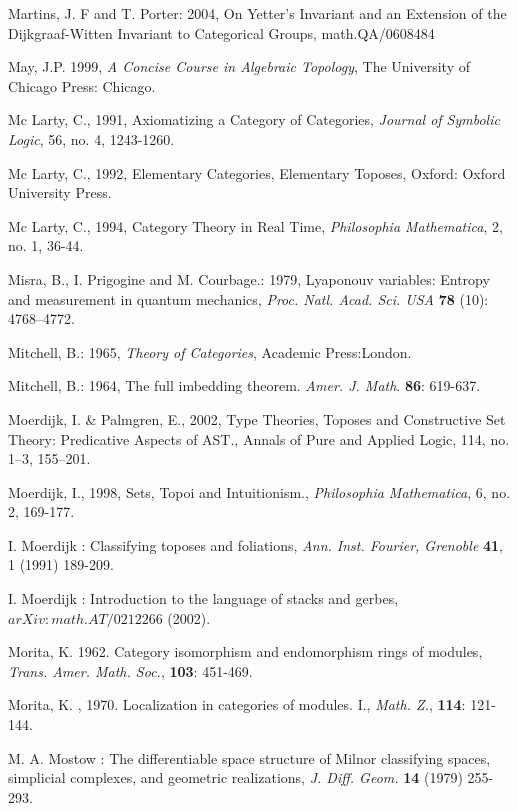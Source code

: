 \documentclass[12pt]{article}
\theoremstyle{plain}
\theoremstyle{definition}
\numberwithin{equation}{section}
\begin{document}
\begin{thebibliography}{99}
Martins, J. F and T. Porter: 2004, On Yetter's Invariant and an Extension of the Dijkgraaf-Witten Invariant to Categorical Groups, math.QA/0608484

May, J.P. 1999, \emph{A Concise Course in Algebraic Topology}, The University of Chicago Press: Chicago.

Mc Larty, C., 1991, Axiomatizing a Category of Categories, \emph{Journal of Symbolic Logic}, 56, no. 4, 1243-1260. 

Mc Larty, C., 1992, Elementary Categories, Elementary Toposes, Oxford: Oxford University Press.

Mc Larty, C., 1994, Category Theory in Real Time, \emph{Philosophia Mathematica}, 2, no. 1, 36-44.

Misra, B.,  I. Prigogine and M. Courbage.: 1979, Lyaponouv variables: Entropy and measurement in quantum mechanics,
\emph{Proc. Natl. Acad. Sci. USA} \textbf{78} (10): 4768--4772.

Mitchell, B.: 1965, \emph{Theory of Categories}, Academic Press:London.

Mitchell, B.: 1964, The full imbedding theorem. \emph{Amer. J. Math}. \textbf{86}: 619-637.

Moerdijk, I. \& Palmgren, E., 2002, Type Theories, Toposes and Constructive Set Theory: Predicative Aspects of AST., Annals of Pure and Applied Logic, 114, no. 1--3, 155--201. 

Moerdijk, I., 1998, Sets, Topoi and Intuitionism., \emph{Philosophia Mathematica}, 6, no. 2, 169-177.

I. Moerdijk : Classifying toposes and foliations, {\it Ann. Inst. Fourier, Grenoble} \textbf{41}, 1 (1991) 189-209.

I. Moerdijk : Introduction to the language of stacks and gerbes, $arXiv:math.AT/0212266$ (2002).

Morita, K. 1962. Category isomorphism and endomorphism rings of modules,
{\em Trans. Amer. Math. Soc.}, \textbf{103}: 451-469.

Morita, K. , 1970. Localization in categories of modules. I., {\em Math. Z.}, 
\textbf{114}: 121-144.

M. A. Mostow : The differentiable space structure of Milnor classifying spaces, simplicial complexes, 
and geometric realizations, \emph{J. Diff. Geom.} \textbf{14} (1979) 255-293.


\end{thebibliography}
\end{document}
